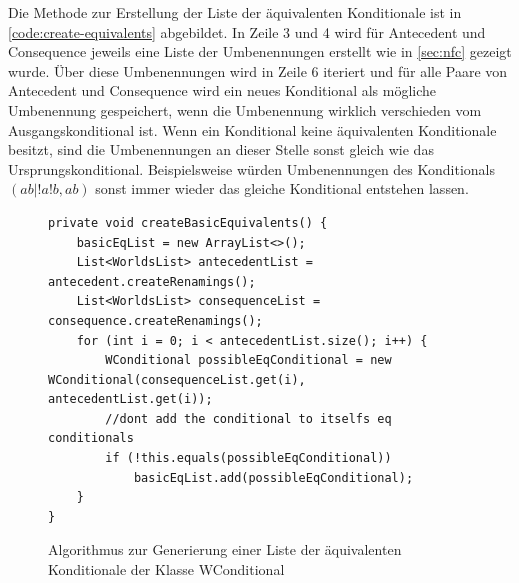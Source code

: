 \documentclass[12pt,a4paper]{article}
\begin{document}
Die Methode zur Erstellung der Liste der äquivalenten Konditionale ist in \autoref{code:create-equivalents} abgebildet. In Zeile 3 und 4 wird für Antecedent und Consequence jeweils eine Liste der Umbenennungen erstellt wie in \autoref{sec:nfc} gezeigt wurde. Über diese Umbenennungen wird in Zeile 6 iteriert und für alle Paare von Antecedent und Consequence wird ein neues Konditional als mögliche Umbenennung gespeichert, wenn die Umbenennung wirklich verschieden vom Ausgangskonditional ist. Wenn ein Konditional keine äquivalenten Konditionale besitzt, sind die Umbenennungen an dieser Stelle sonst gleich wie das Ursprungskonditional. Beispielsweise würden Umbenennungen des Konditionals $(ab|!a!b,ab)$ sonst immer wieder das gleiche Konditional entstehen lassen. 


\begin{figure}
\begin{lstlisting}
private void createBasicEquivalents() {
    basicEqList = new ArrayList<>();
    List<WorldsList> antecedentList = antecedent.createRenamings();
    List<WorldsList> consequenceList = consequence.createRenamings();
    for (int i = 0; i < antecedentList.size(); i++) {
        WConditional possibleEqConditional = new WConditional(consequenceList.get(i), antecedentList.get(i));
        //dont add the conditional to itselfs eq conditionals
        if (!this.equals(possibleEqConditional))
            basicEqList.add(possibleEqConditional);
    }
}
\end{lstlisting}
\caption{Algorithmus zur Generierung einer Liste der äquivalenten Konditionale der Klasse WConditional}
\label{code:create-equivalents}
\end{figure} 
\end{document}
